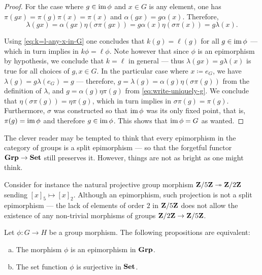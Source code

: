\begin{proof}
For the case where \(g \in \operatorname{im} \phi\) and \(x \in G\) is any element, one has
\(\pi(g x) = \pi(g) \pi(x) = \pi(x)\) and \(\alpha(g x) = g
\alpha(x)\). Therefore,
\[
\lambda(g x)
= \alpha(g x) \eta(\sigma \pi(g x))
= g \alpha(x) \eta(\sigma \pi(x))
= g \lambda(x).
\]


Using \cref{eq:k=l-any-x-in-G} one concludes that \(k(g) = \ell(g)\) for all
\(g \in \operatorname{im} \phi\) --- which in turn implies in \(k \phi = \ell \phi\). Note
however that since \(\phi\) is an epimorphism by hypothesis, we conclude that
\(k = \ell\) in general --- thus \(\lambda(g x) = g \lambda(x)\) is true for all
choices of \(g, x \in G\). In the particular case where \(x \coloneq e_G\), we
have \(\lambda(g) = g \lambda(e_G) = g\) --- therefore,
\(g = \lambda(g) = \alpha(g) \eta (\sigma \pi(g))\) from the definition of
\(\lambda\), and \(g = \alpha(g) \eta \pi(g)\) from
\cref{eq:write-uniquely-g}. We conclude that
\(\eta (\sigma \pi(g)) = \eta \pi(g)\), which in turn implies in
\(\sigma \pi(g) = \pi(g)\). Furthermore, \(\sigma\) was constructed so that
\(\operatorname{im} \phi\) was its only fixed point, that is, \(\pi(g) = \operatorname{im} \phi\) and
therefore \(g \in \operatorname{im} \phi\). This shows that \(\operatorname{im} \phi = G\) as wanted.
\end{proof}

\begin{remark}
\label{rem:not-every-grp-epi-is-split}
The clever reader may be tempted to think that every epimorphism in the category
of groups is a split epimorphism --- so that the forgetful functor
\({\textbf{Grp}} \to {\textbf{Set}}\) still preserves it. However, things are not as bright as one
might think.

Consider for instance the natural projective group morphism
\(\mathbf{Z}/5\mathbf{Z} \twoheadrightarrow \mathbf{Z}/2\mathbf{Z}\) sending \([x]_5 \mapsto [x]_2\). Although an epimorphism,
such projection is not a split epimorphism --- the lack of elements of order
\(2\) in \(\mathbf{Z}/5\mathbf{Z}\) does not allow the existence of any non-trivial morphisms of
groups \(\mathbf{Z}/2\mathbf{Z} \to \mathbf{Z}/5\mathbf{Z}\).
\end{remark}

\begin{proposition}
\label{prop:epic-in-grp}
Let \(\phi: G \to H\) be a group morphism. The following propositions are
equivalent:
\begin{enumerate}[(a)]\setlength\itemsep{0em}
\item The morphism \(\phi\) is an epimorphism in \({\textbf{Grp}}\).
\item The set function \(\phi\) is surjective in \({\textbf{Set}}\).
\end{enumerate}
\end{proposition}

